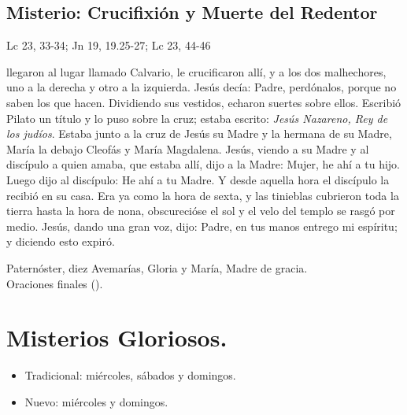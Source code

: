 \documentclass[./main.tex]{subfiles}
\newcounter{sorrowful-counter}
\newcounter{glorious-counter}
\begin{document}
\subsection*{ Misterio: Crucifixión y Muerte del Redentor}
\begin{flushright}
      {\color{red}Lc 23, 33-34; Jn 19, 19.25-27; Lc 23, 44-46}
\end{flushright}
 llegaron al lugar llamado Calvario, le crucificaron allí, y a los dos malhechores, uno a la derecha y otro a la izquierda. Jesús decía: 
Padre, perdónalos, porque no saben los que hacen. Dividiendo sus vestidos, echaron suertes sobre ellos. Escribió Pilato un título y lo puso sobre la cruz; 
estaba escrito: \textit{Jesús Nazareno, Rey de los judíos}. Estaba junto a la cruz de Jesús su Madre y la hermana de su Madre, María la debajo Cleofás y María Magdalena. 
Jesús, viendo a su Madre y al discípulo a quien amaba, que estaba allí, dijo a la Madre: Mujer, he ahí a tu hijo. Luego dijo al discípulo: He ahí a tu Madre. 
Y desde aquella hora el discípulo la recibió en su casa. Era ya como la hora de sexta, y las tinieblas cubrieron toda la tierra hasta la hora de nona, 
obscurecióse el sol y el velo del templo se rasgó por medio. Jesús, dando una gran voz, dijo: Padre, en tus manos entrego mi espíritu; y diciendo esto expiró.

\begin{center}
      Paternóster, diez Avemarías, Gloria y María, Madre de gracia.\\
      Oraciones finales ().
\end{center}

\section*{Misterios Gloriosos.}
\begin{itemize}
      \item Tradicional: miércoles, sábados y domingos.
      \item Nuevo: miércoles y domingos.
\end{itemize}

\end{document}
